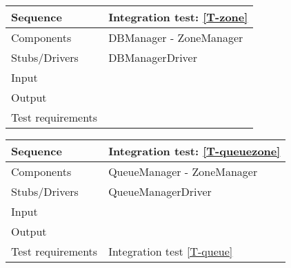 \begin{table}[H]
    \begin{tabularx}{\textwidth}{l|X}
        \hline
        Sequence
        & 
        Integration test: \ref{T-zone}
        \\ \hline
        Components 
        & 
        DBManager - ZoneManager
        \\ \hline
        Stubs/Drivers 
        & 
        DBManagerDriver
        \\ \hline
        Input 
        & 
       
        \\ \hline
        Output 
        & 
        
        \\ \hline
        Test requirements 
        & 
        
        \\ \hline
    \end{tabularx}
\end{table}

\begin{table}[H]
    \begin{tabularx}{\textwidth}{l|X}
        \hline
        Sequence
        & 
        Integration test: \ref{T-queuezone}
        \\ \hline
        Components 
        & 
        QueueManager - ZoneManager
        \\ \hline
        Stubs/Drivers 
        & 
        QueueManagerDriver
        \\ \hline
        Input 
        & 
       
        \\ \hline
        Output 
        & 
        
        \\ \hline
        Test requirements 
        & 
        Integration test \ref{T-queue}
        \\ \hline
    \end{tabularx}
\end{table}





